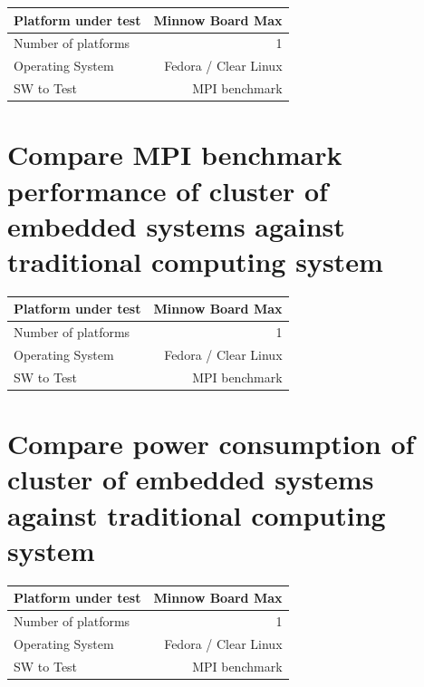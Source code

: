     \begin{center}
    \begin{tabular}{ | l | r |}
        \hline
        Platform under test & Minnow Board  Max \\ \hline
        Number of platforms  & 1  \\ \hline
        Operating System & Fedora / Clear Linux  \\ \hline
        SW to Test & MPI benchmark \\ \hline
    \end{tabular}
     \label{Sanity Sumary}
    \end{center}


\section{Compare MPI benchmark performance of cluster of embedded systems
against traditional computing system}


    \begin{center}
    \begin{tabular}{ | l | r |}
        \hline
        Platform under test & Minnow Board  Max \\ \hline
        Number of platforms  & 1  \\ \hline
        Operating System & Fedora / Clear Linux  \\ \hline
        SW to Test & MPI benchmark \\ \hline
    \end{tabular}
     \label{Sanity Sumary}
    \end{center}


\section{Compare power consumption of cluster of embedded systems against
traditional computing system}

    \begin{center}
    \begin{tabular}{ | l | r |}
        \hline
        Platform under test & Minnow Board  Max \\ \hline
        Number of platforms  & 1  \\ \hline
        Operating System & Fedora / Clear Linux  \\ \hline
        SW to Test & MPI benchmark \\ \hline
    \end{tabular}
     \label{Sanity Sumary}
    \end{center}



